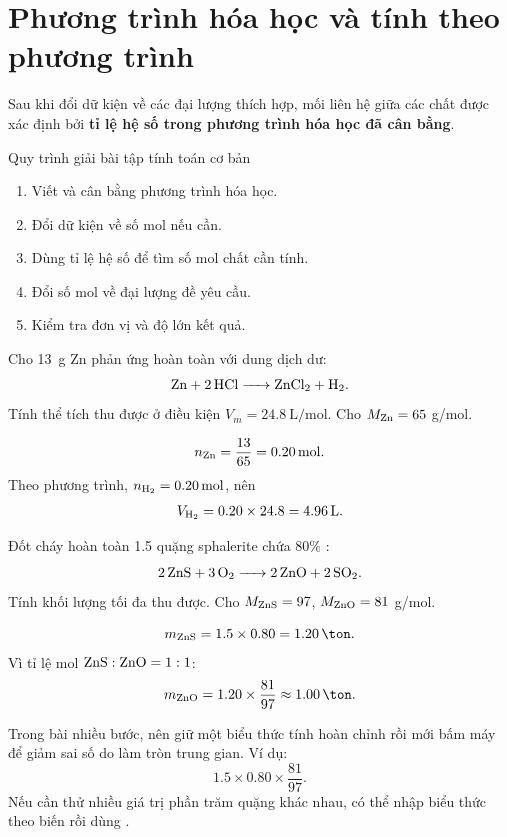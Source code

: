 \section{Phương trình hóa học và tính theo phương trình}

Sau khi đổi dữ kiện về các đại lượng thích hợp, mối liên hệ giữa các chất được xác định bởi \textbf{tỉ lệ hệ số trong phương trình hóa học đã cân bằng}.

\begin{ghinho}{Quy trình giải bài tập tính toán cơ bản}
\begin{enumerate}
\item Viết và cân bằng phương trình hóa học.
\item Đổi dữ kiện về số mol nếu cần.
\item Dùng tỉ lệ hệ số để tìm số mol chất cần tính.
\item Đổi số mol về đại lượng đề yêu cầu.
\item Kiểm tra đơn vị và độ lớn kết quả.
\end{enumerate}
\end{ghinho}

\begin{vidu}
Cho \SI{13}{\gram} Zn phản ứng hoàn toàn với dung dịch  dư:
\[
\ce{Zn + 2HCl -> ZnCl2 + H2}.
\]
Tính thể tích  thu được ở điều kiện \(V_m=\SI{24.8}{\liter\per\mole}\). Cho \(M_{\ce{Zn}}=65\) g/mol.
\end{vidu}
\begin{loigiai}
\[
n_{\ce{Zn}}=\frac{13}{65}=\SI{0.20}{\mole}.
\]
Theo phương trình, \(n_{\ce{H2}}=\SI{0.20}{\mole}\), nên
\[
V_{\ce{H2}}=0.20\times24.8=\SI{4.96}{\liter}.
\]
\end{loigiai}

\begin{vidu}
Đốt cháy hoàn toàn \SI{1.5}{\ton} quặng sphalerite chứa \(80\%\) :
\[
\ce{2ZnS + 3O2 -> 2ZnO + 2SO2}.
\]
Tính khối lượng  tối đa thu được. Cho \(M_{\ce{ZnS}}=97\), \(M_{\ce{ZnO}}=81\) g/mol.
\end{vidu}
\begin{loigiai}
\[
m_{\ce{ZnS}}=1.5\times0.80=\SI{1.20}{\ton}.
\]
Vì tỉ lệ mol \(\ce{ZnS}:\ce{ZnO}=1:1\):
\[
m_{\ce{ZnO}}=1.20\times\frac{81}{97}\approx\SI{1.00}{\ton}.
\]
\end{loigiai}

\begin{casiobox}
Trong bài nhiều bước, nên giữ một biểu thức tính hoàn chỉnh rồi mới bấm máy để giảm sai số do làm tròn trung gian. Ví dụ:
\[
1.5\times0.80\times\frac{81}{97}.
\]
Nếu cần thử nhiều giá trị phần trăm quặng khác nhau, có thể nhập biểu thức theo biến rồi dùng .
\end{casiobox}

